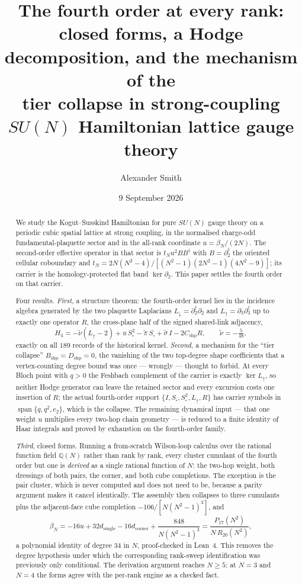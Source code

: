 \documentclass[11pt]{article}
\title{The fourth order at every rank:\\
closed forms, a Hodge decomposition, and the mechanism of the\\
tier collapse in strong-coupling $SU(N)$ Hamiltonian lattice gauge theory}
\author{Alexander Smith}
\date{9 September 2026}
\theoremstyle{definition}
\theoremstyle{remark}
\newcommand{\dg}{^{\dagger}}
\newcommand{\Ldn}{L_{\downarrow}}
\newcommand{\Lup}{L_{\uparrow}}
\newcommand{\Ssq}{S_{\square}}
\newcommand{\Q}{\mathbb{Q}}
\begin{document}
\maketitle

\begin{abstract}
\noindent
We study the Kogut--Susskind Hamiltonian for pure $SU(N)$ gauge theory on a
periodic cubic spatial lattice at strong coupling, in the normalised
charge-odd fundamental-plaquette sector and in the all-rank coordinate
$u=\beta_N/(2N)$. The second-order effective operator in that sector is
$t_Nu^2BB\dg$ with $B=\partial_2\dg$ the oriented cellular coboundary and
$t_N=2N(N^2-4)/[(N^2-1)(2N^2-1)(4N^2-9)]$; its carrier is the homology-protected
flat band $\ker\partial_2$. This paper settles the fourth order on that carrier.

Four results. \emph{First}, a structure theorem: the fourth-order kernel lies
in the incidence algebra generated by the two plaquette Laplacians
$\Ldn=\partial_2\dg\partial_2$ and $\Lup=\partial_3\partial_3\dg$ up to exactly
one operator $R$, the cross-plane half of the signed shared-link adjacency,
\[
  H_4=-\tilde\nu(\Lup-2)+u\,\Ssq^2-\tilde\pi\,\Ssq+\tilde\sigma\,I-2C_{\mathrm{shp}}R,
  \qquad \tilde\nu=-\tfrac{5}{48},
\]
exactly on all $189$ records of the historical kernel. \emph{Second}, a
mechanism for the ``tier collapse'' $B_{\mathrm{shp}}=D_{\mathrm{shp}}=0$, the
vanishing of the two top-degree shape coefficients that a vertex-counting
degree bound was once --- wrongly --- thought to forbid. At every Bloch point
with $q>0$ the Feshbach complement of the carrier is exactly $\ker\Lup$, so
neither Hodge generator can leave the retained sector and every excursion costs
one insertion of $R$; the actual fourth-order support $\{I,\Ssq,\Ssq^2,\Lup,R\}$
has carrier symbols in $\operatorname{span}\{q,q^2,e_2\}$, which is the
collapse. The remaining dynamical input --- that one weight $u$ multiplies every
two-hop chain geometry --- is reduced to a finite identity of Haar integrals and
proved by exhaustion on the fourth-order family.

\emph{Third}, closed forms. Running a from-scratch Wilson-loop calculus over the
rational function field $\Q(N)$ rather than rank by rank, every cluster cumulant
of the fourth order but one is \emph{derived} as a single rational function of
$N$: the two-hop weight, both dressings of both pairs, the corner, and both cube
completions. The exception is the pair cluster, which is never computed and does
not need to be, because a parity argument makes it cancel identically. The
assembly then collapses to three cumulants plus the adjacent-face cube
completion $-106/[N(N^2-1)^3]$, and
\[
  \beta_N=-16u+32d_{\mathrm{single}}-16d_{\mathrm{corner}}+\frac{848}{N(N^2-1)^3}
        =\frac{P_{17}(N^2)}{N\,R_{20}(N^2)},
\]
a polynomial identity of degree $34$ in $N$, proof-checked in Lean~4. This
removes the degree hypothesis under which the corresponding rank-sweep
identification was previously only conditional. The derivation argument reaches
$N\ge5$; at $N=3$ and $N=4$ the forms agree with the per-rank engine as a
checked fact.


\end{abstract}
\end{document}
